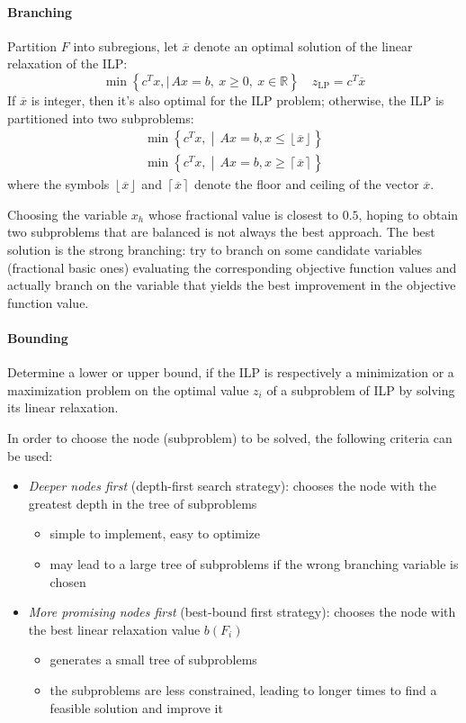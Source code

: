 \paragraph*{Branching}
Partition $F$ into subregions, let $\overline{x}$ denote an optimal solution of the linear relaxation of the ILP:
\[ \min\left\{ c^T x, \mid\, Ax = b, \ x \geq 0, \ x \in \mathbb{R} \right\} \quad z_{\text{LP}} = c^T \overline{x} \]
If $\overline{x}$ is integer, then it's also optimal for the ILP problem;
otherwise, the ILP is partitioned into two subproblems:
\begin{gather}
    \min\left\{ c^T x, \middle\vert\, Ax = b, x \leq \left\lfloor \overline{x} \right\rfloor \right\} \label{eq:branch1}\tag{ILP 1} \\
    \min\left\{ c^T x, \middle\vert\, Ax = b, x \geq \left\lceil \overline{x} \right\rceil \right\} \label{eq:branch2}\tag{ILP 2}
\end{gather}
where the symbols $ \left\lfloor \overline{x} \right\rfloor $ and $ \left\lceil \overline{x} \right\rceil $ denote the floor and ceiling of the vector $\overline{x}$.

Choosing the variable $x_h$ whose fractional value is closest to $0.5$, hoping to obtain two subproblems that are balanced is not always the best approach.
The best solution is the strong branching:
try to branch on some candidate variables (fractional basic ones) evaluating the corresponding objective function values and actually branch on the variable that yields the best improvement in the objective function value.

\paragraph*{Bounding}
Determine a lower or upper bound, if the ILP is respectively a minimization or a maximization problem on the optimal value $z_i$ of a subproblem of ILP by solving its linear relaxation.

In order to choose the node (subproblem) to be solved, the following criteria can be used:
\begin{itemize}
    \item \textit{Deeper nodes first} (depth-first search strategy): chooses the node with the greatest depth in the tree of subproblems
        \begin{itemize}
            \item simple to implement, easy to optimize
            \item may lead to a large tree of subproblems if the wrong branching variable is chosen
        \end{itemize}
    \item \textit{More promising nodes first} (best-bound first strategy): chooses the node with the best linear relaxation value $b(F_i)$
        \begin{itemize}
            \item generates a small tree of subproblems
            \item the subproblems are less constrained, leading to longer times to find a feasible solution and improve it
        \end{itemize}
\end{itemize}

